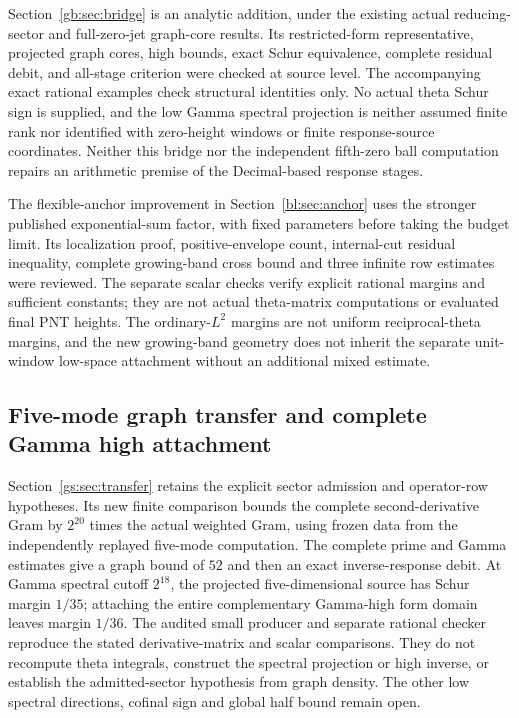 \documentclass[11pt,a4paper]{article}
\numberwithin{equation}{section}
\theoremstyle{definition}\newtheorem{definition}[theorem]{Definition}
\theoremstyle{remark}\newtheorem{remark}[theorem]{Remark}
\begin{document}
Section~\ref{gb:sec:bridge} is an analytic addition, under the existing
actual reducing-sector and full-zero-jet graph-core results. Its
restricted-form representative, projected graph cores, high bounds,
exact Schur equivalence, complete residual debit, and all-stage criterion
were checked at source level. The accompanying exact rational examples
check structural identities only. No actual theta Schur sign is supplied,
and the low Gamma spectral projection is neither assumed finite rank nor
identified with zero-height windows or finite response-source coordinates.
Neither this bridge nor the independent fifth-zero ball computation
repairs an arithmetic premise of the Decimal-based response stages.


The flexible-anchor improvement in Section~\ref{bl:sec:anchor} uses the
stronger published exponential-sum factor, with fixed parameters before
taking the budget limit. Its localization proof, positive-envelope count,
internal-cut residual inequality, complete growing-band cross bound and
three infinite row estimates were reviewed. The separate scalar checks
verify explicit rational margins and sufficient constants; they are not
actual theta-matrix computations or evaluated final PNT heights. The
ordinary-$L^2$ margins are not uniform reciprocal-theta margins, and the
new growing-band geometry does not inherit the separate unit-window
low-space attachment without an additional mixed estimate.


\subsection{Five-mode graph transfer and complete Gamma high attachment}
Section~\ref{gs:sec:transfer} retains the explicit sector admission and
operator-row hypotheses. Its new finite comparison bounds the complete
second-derivative Gram by $2^{20}$ times the actual weighted Gram, using
frozen data from the independently replayed five-mode computation.
The complete prime and Gamma estimates give a graph bound of $52$ and
then an exact inverse-response debit. At Gamma spectral cutoff $2^{18}$,
the projected five-dimensional source has Schur margin $1/35$; attaching
the entire complementary Gamma-high form domain leaves margin $1/36$.
The audited small producer and separate rational checker reproduce the
stated derivative-matrix and scalar comparisons. They do not recompute
theta integrals, construct the spectral projection or high inverse, or
establish the admitted-sector hypothesis from graph density. The other
low spectral directions, cofinal sign and global half bound remain open.
\end{document}
